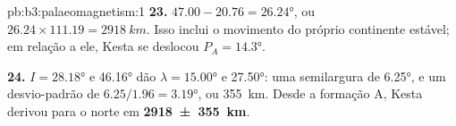 \begin{solution}{pb:b3:palaeomagnetism:1}
\textbf{23.} $47.00 - 20.76 = \ang{26.24}$, ou $26.24\times111.19 =
\qty{2918}{km}$. Isso inclui o movimento do próprio continente estável;
em relação a ele, Kesta se deslocou $P_A = \ang{14.3}$.

\textbf{24.} $I = \ang{28.18}$ e \ang{46.16} dão $\lambda = \ang{15.00}$ e
\ang{27.50}: uma semilargura de \ang{6.25}, e um desvio-padrão de
$6.25/1.96 = \ang{3.19}$, ou \qty{355}{km}. Desde a formação A, Kesta derivou
para o norte em
\textbf{\qty[text-series-to-math=true]{2918 \pm 355}{km}}.
\end{solution}
